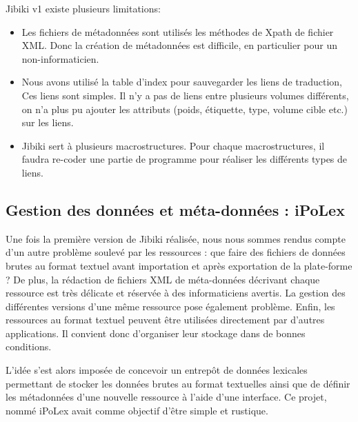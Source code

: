 \documentclass[10pt,a4paper,twoside]{article}
\begin{document}
Jibiki v1 existe plusieurs limitations:
\begin{itemize}
\item Les fichiers de métadonnées sont utilisés les méthodes de Xpath de fichier XML. Donc la création de métadonnées est difficile, en particulier pour un non-informaticien.
\item Nous avons utilisé la table d'index pour sauvegarder les liens de traduction, Ces liens sont simples. Il n'y a pas de liens entre plusieurs volumes différents, on n'a plus pu ajouter les attributs (poids, étiquette, type, volume cible etc.) sur les liens. 
\item Jibiki sert à plusieurs macrostructures. Pour chaque macrostructures, il faudra re-coder une partie de programme pour réaliser les différents types de liens.
\end{itemize}


\cite{MMAC06}

\subsection{Gestion des données et méta-données : iPoLex}


Une fois la première version de Jibiki réalisée, nous nous sommes rendus compte d'un autre problème soulevé par les ressources : que faire des fichiers de données brutes au format textuel avant importation et après exportation de la plate-forme ? 
De plus, la rédaction de fichiers XML de méta-données décrivant chaque ressource est très délicate et réservée à des informaticiens avertis.
La gestion des différentes versions d'une même ressource pose également problème.
Enfin, les ressources au format textuel peuvent être utilisées directement par d'autres applications. Il convient donc d'organiser leur stockage dans de bonnes conditions.

L'idée s'est alors imposée de concevoir un entrepôt de données lexicales permettant de stocker les données brutes au format textuelles ainsi que de définir les métadonnées d'une nouvelle ressource à l'aide d'une interface. Ce projet, nommé iPoLex avait comme objectif d'être simple et rustique.
\end{document}
